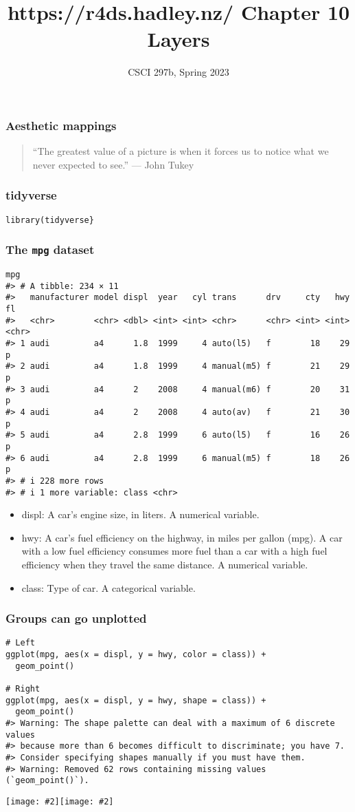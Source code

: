 \documentclass{beamer}
\title{{https://r4ds.hadley.nz/} Chapter 10\\Layers}
\author{CSCI 297b, Spring 2023}
\newcommand{\bi}{\begin{itemize}}
\newcommand{\li}{\item}
\newcommand{\ei}{\end{itemize}}
\newcommand{\figg}[2]{\texttt{[image: \#2]}}
\newcommand{\bfr}[1]{\begin{frame}[fragile]\frametitle{{ #1 }}}
\begin{document}
\begin{frame}
\maketitle
\end{frame}

\bfr{Aesthetic mappings}

\begin{quotation}
“The greatest value of a picture is when it forces us to notice what we never expected to see.” — John Tukey
\end{quotation}
\end{frame}

\bfr{tidyverse}

\begin{verbatim}
library(tidyverse}
\end{verbatim}
\end{frame}



\bfr{The {\tt mpg} dataset}\scriptsize
\begin{verbatim}
mpg
#> # A tibble: 234 × 11
#>   manufacturer model displ  year   cyl trans      drv     cty   hwy fl   
#>   <chr>        <chr> <dbl> <int> <int> <chr>      <chr> <int> <int> <chr>
#> 1 audi         a4      1.8  1999     4 auto(l5)   f        18    29 p    
#> 2 audi         a4      1.8  1999     4 manual(m5) f        21    29 p    
#> 3 audi         a4      2    2008     4 manual(m6) f        20    31 p    
#> 4 audi         a4      2    2008     4 auto(av)   f        21    30 p    
#> 5 audi         a4      2.8  1999     6 auto(l5)   f        16    26 p    
#> 6 audi         a4      2.8  1999     6 manual(m5) f        18    26 p    
#> # i 228 more rows
#> # i 1 more variable: class <chr>
\end{verbatim}
\bi
\li displ: A car’s engine size, in liters. A numerical variable.
\li
hwy: A car’s fuel efficiency on the highway, in miles per gallon (mpg). A car with a low fuel efficiency consumes more fuel than a car with a high fuel efficiency when they travel the same distance. A numerical variable.
\li
class: Type of car. A categorical variable.
\ei
\end{frame}

\bfr{Groups can go unplotted}\scriptsize
\begin{verbatim}
# Left
ggplot(mpg, aes(x = displ, y = hwy, color = class)) +
  geom_point()

# Right
ggplot(mpg, aes(x = displ, y = hwy, shape = class)) +
  geom_point()
#> Warning: The shape palette can deal with a maximum of 6 discrete values
#> because more than 6 becomes difficult to discriminate; you have 7.
#> Consider specifying shapes manually if you must have them.
#> Warning: Removed 62 rows containing missing values (`geom_point()`).
\end{verbatim}
\figg{.5}{unnamed-chunk-4-1.png}\figg{.5}{unnamed-chunk-4-2.png}
\end{frame}
\end{document}
